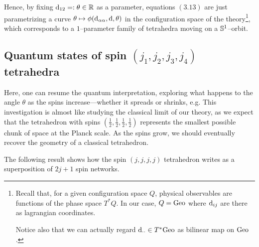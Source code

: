Hence, by fixing $\d_{12}=:\theta\in\R$ as a parameter, equations $(3.13)$ are just parametrizing a curve $\theta\mapsto\phi(\d_{\alpha\alpha},\d,\theta)$ in the configuration space of the theory\footnote{Recall that, for a given configuration space $Q$, physical observables are functions of the phase space $T^*Q$. In our case, $Q=\Geo$ where $\d_{ij}$ are there as lagrangian coordinates.

Notice also that we can actually regard $\d_{\cdot\cdot}\in T^*\Geo$ as bilinear map on $\Geo$.}, which corresponds to a $1$--parameter family of tetrahedra moving on a $\S^1$--orbit.%

\subsection{Quantum states of spin $(j_1,j_2,j_3,j_4)$ tetrahedra}

Here, one can resume the quantum interpretation, exploring what happens to the angle $\theta$ as the spins increase---whether it spreads or shrinks, e.g. This investigation is %
almost like studying the classical limit of our theory, as we expect that the tetrahedron with spins $(\frac{1}{2},\frac{1}{2},\frac{1}{2},\frac{1}{2})$ represents the smallest possible chunk of space at the Planck scale. As the spins grow, we should eventually recover the geometry of a classical tetrahedron.

The following result shows how the spin $(j,j,j,j)$ tetrahedron writes as a superposition of $2j+1$ spin networks.

